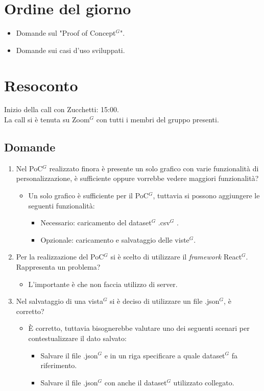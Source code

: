 \section{Ordine del giorno}

\begin{itemize}
	\item Domande sul "Proof of Concept$^{G}$".
	\item Domande sui casi d'uso sviluppati.
\end{itemize}

\section{Resoconto}
\label{sec:Resoconto}

\noindent 
Inizio della call con Zucchetti: 15:00. \\
\noindent La call si è tenuta su Zoom$^{G}$ con tutti i membri del gruppo presenti.

\subsection{Domande}
\begin{enumerate}
	\item Nel PoC$^{G}$ realizzato finora è presente un solo grafico con varie funzionalità di personalizzazione, è sufficiente oppure vorrebbe vedere maggiori funzionalità?
	\begin{itemize}
		\item Un solo grafico è sufficiente per il PoC$^{G}$, tuttavia si possono aggiungere le seguenti funzionalità:
		\begin{itemize}
			\item Necessario: caricamento del dataset$^{G}$ .csv$^{G}$ .
			\item Opzionale: caricamento e salvataggio delle viste$^{G}$.
		\end{itemize}
	\end{itemize}
	\item Per la realizzazione del PoC$^{G}$ si è scelto di utilizzare il \textit{framework} React$^{G}$. Rappresenta un problema?
	\begin{itemize}
		\item L'importante è che non faccia utilizzo di server.
	\end{itemize}
	\item Nel salvataggio di una vista$^{G}$ si è deciso di utilizzare un file .json$^{G}$, è corretto?
	\begin{itemize}
		\item È corretto, tuttavia bisognerebbe valutare uno dei seguenti scenari per contestualizzare il dato salvato:
		\begin{itemize}
			\item Salvare il file .json$^{G}$ e in un riga specificare a quale dataset$^{G}$ fa riferimento.
			\item Salvare il file .json$^{G}$ con anche il dataset$^{G}$ utilizzato collegato.
		\end{itemize}
	\end{itemize}
\end{enumerate}


